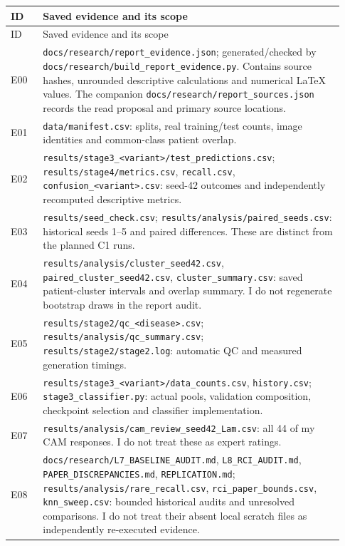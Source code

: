 \documentclass[11pt,a4paper]{article}
\newcommand{\file}[1]{\nolinkurl{#1}}
\begin{document}
\begin{longtable}{>{\raggedright\arraybackslash}p{0.09\linewidth}
                  >{\raggedright\arraybackslash}p{0.84\linewidth}}
\toprule ID & Saved evidence and its scope\\\midrule
\endfirsthead
\toprule ID & Saved evidence and its scope\\\midrule
\endhead
\bottomrule\endfoot
E00 & \file{docs/research/report_evidence.json}; generated/checked by
\file{docs/research/build_report_evidence.py}. Contains source hashes,
unrounded descriptive calculations and numerical LaTeX values. The companion
\file{docs/research/report_sources.json} records the read proposal and primary
source locations.\\
E01 & \file{data/manifest.csv}: splits, real training/test counts, image
identities and common-class patient overlap.\\
E02 & \file{results/stage3_<variant>/test_predictions.csv};
\file{results/stage4/metrics.csv}, \file{recall.csv},
\file{confusion_<variant>.csv}: seed-42 outcomes and independently recomputed
descriptive metrics.\\
E03 & \file{results/seed_check.csv};
\file{results/analysis/paired_seeds.csv}: historical seeds 1--5 and paired
differences. These are distinct from the planned C1 runs.\\
E04 & \file{results/analysis/cluster_seed42.csv},
\file{paired_cluster_seed42.csv}, \file{cluster_summary.csv}:
saved patient-cluster intervals and overlap summary. I do not regenerate
bootstrap draws in the report audit.\\
E05 & \file{results/stage2/qc_<disease>.csv};
\file{results/analysis/qc_summary.csv}; \file{results/stage2/stage2.log}:
automatic QC and measured generation timings.\\
E06 & \file{results/stage3_<variant>/data_counts.csv}, \file{history.csv};
\file{stage3_classifier.py}: actual pools, validation composition,
checkpoint selection and classifier implementation.\\
E07 & \file{results/analysis/cam_review_seed42_Lam.csv}: all 44 of my CAM
responses. I do not treat these as expert ratings.\\
E08 & \file{docs/research/L7_BASELINE_AUDIT.md},
\file{L8_RCI_AUDIT.md}, \file{PAPER_DISCREPANCIES.md},
\file{REPLICATION.md}; \file{results/analysis/rare_recall.csv},
\file{rci_paper_bounds.csv}, \file{knn_sweep.csv}:
bounded historical audits and unresolved comparisons. I do not treat their
absent local scratch files as independently re-executed evidence.\\

\end{longtable}
\end{document}
